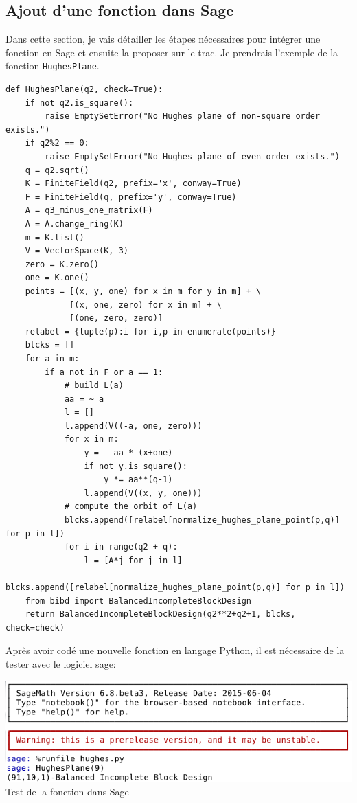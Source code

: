 \documentclass[a4paper]{article}
\begin{document}
\subsection{Ajout d'une fonction dans Sage}
Dans cette section, je vais détailler les étapes nécessaires pour intégrer une fonction en Sage et ensuite la proposer sur le trac. Je prendrais l'exemple de la fonction \texttt{HughesPlane}.\medskip\\ 
\begin{lstlisting}
def HughesPlane(q2, check=True):
    if not q2.is_square():
        raise EmptySetError("No Hughes plane of non-square order exists.")
    if q2%2 == 0:
        raise EmptySetError("No Hughes plane of even order exists.")
    q = q2.sqrt()
    K = FiniteField(q2, prefix='x', conway=True)
    F = FiniteField(q, prefix='y', conway=True)
    A = q3_minus_one_matrix(F)
    A = A.change_ring(K)
    m = K.list()
    V = VectorSpace(K, 3)
    zero = K.zero()
    one = K.one()
    points = [(x, y, one) for x in m for y in m] + \
             [(x, one, zero) for x in m] + \
             [(one, zero, zero)]
    relabel = {tuple(p):i for i,p in enumerate(points)}
    blcks = []
    for a in m:
        if a not in F or a == 1:
            # build L(a)
            aa = ~ a
            l = []
            l.append(V((-a, one, zero)))
            for x in m:
                y = - aa * (x+one)
                if not y.is_square():
                    y *= aa**(q-1)
                l.append(V((x, y, one)))
            # compute the orbit of L(a)
            blcks.append([relabel[normalize_hughes_plane_point(p,q)] for p in l])
            for i in range(q2 + q):
                l = [A*j for j in l]
                blcks.append([relabel[normalize_hughes_plane_point(p,q)] for p in l])
    from bibd import BalancedIncompleteBlockDesign
    return BalancedIncompleteBlockDesign(q2**2+q2+1, blcks, check=check)
  \end{lstlisting}
\newpage
Après avoir codé une nouvelle fonction en langage Python, il est nécessaire de la tester avec le logiciel sage:
\begin{center}
\includegraphics[scale=0.7]{hughessage.png}\vspace{1\baselineskip}\\
Test de la fonction dans Sage
\end{center}
\end{document}
